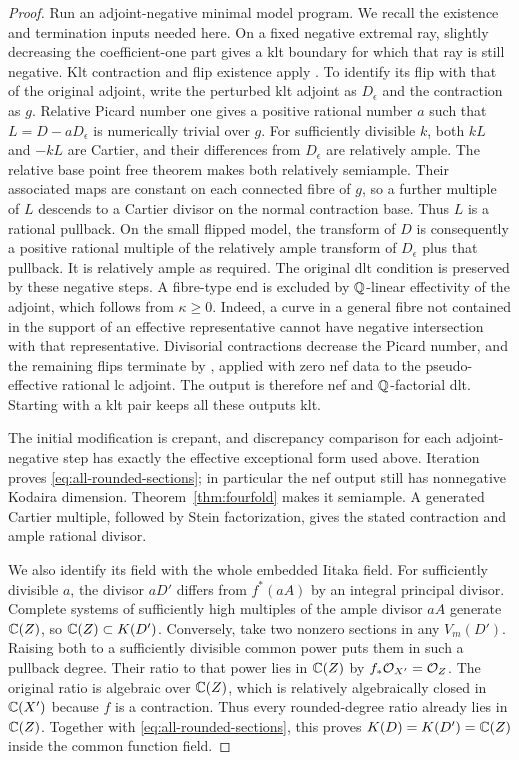 \begin{proof}
Run an adjoint-negative minimal model program. We recall the existence
and termination inputs needed here. On a fixed negative extremal ray,
slightly decreasing the coefficient-one part gives a klt boundary
for which that ray is still negative. Klt contraction and flip
existence apply \cite{BCHM2010}. To identify its flip with that of the
original adjoint, write the perturbed klt adjoint as $D_\epsilon$ and
the contraction as $g$. Relative Picard number one gives a positive
rational number $a$ such that $L=D-aD_\epsilon$ is numerically trivial
over $g$. For sufficiently divisible $k$, both $kL$ and $-kL$ are
Cartier, and their differences from $D_\epsilon$ are relatively ample.
The relative base point free theorem makes both relatively semiample.
Their associated maps are constant on each connected fibre of $g$,
so a further multiple of $L$ descends to a Cartier divisor on the
normal contraction base. Thus $L$ is a rational pullback. On the
small flipped model, the transform of $D$ is consequently a positive
rational multiple of the relatively ample transform of $D_\epsilon$
plus that pullback. It is relatively ample as required. The original
dlt condition is preserved by these negative steps. A fibre-type end
is excluded by \(\mathbb Q\)-linear effectivity of the adjoint, which follows
from $\kappa\geq0$. Indeed, a curve in a general fibre not contained in the
support of an effective representative cannot have negative
intersection with that representative. Divisorial contractions
decrease the Picard number, and the remaining flips terminate by
\cite[Theorem~1.1]{ChenTsakanikas2023}, applied with zero nef
data to the pseudo-effective rational lc adjoint. The output is
therefore nef and \(\mathbb Q\)-factorial dlt. Starting with a klt pair
keeps all these outputs klt.

The initial modification is crepant, and discrepancy comparison for
each adjoint-negative step has exactly the effective exceptional form
used above. Iteration proves \eqref{eq:all-rounded-sections}; in
particular the nef output still has nonnegative Kodaira dimension.
Theorem~\ref{thm:fourfold} makes it semiample. A generated Cartier
multiple, followed by Stein factorization, gives the stated
contraction and ample rational divisor.

We also identify its field with the whole embedded Iitaka field.
For sufficiently divisible $a$, the divisor $aD'$ differs from $f^*(aA)$
by an integral principal divisor. Complete systems of sufficiently high
multiples of the ample divisor $aA$ generate $\mathbb C(Z)$, so
$\mathbb C(Z)\subset K(D')$. Conversely, take two nonzero sections in any
$V_m(D')$. Raising both to a sufficiently divisible common power puts
them in such a pullback degree. Their ratio to that power lies in
$\mathbb C(Z)$ by $f_*\mathcal O_{X'}=\mathcal O_Z$. The original ratio is algebraic over
$\mathbb C(Z)$, which is relatively algebraically closed in $\mathbb C(X')$ because
$f$ is a contraction. Thus every rounded-degree ratio already lies in
$\mathbb C(Z)$. Together with \eqref{eq:all-rounded-sections}, this proves
$K(D)=K(D')=\mathbb C(Z)$ inside the common function field.
\end{proof}

